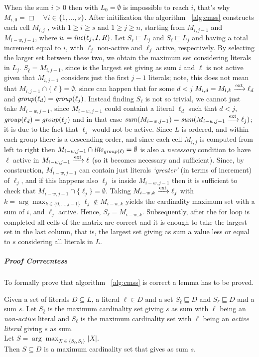 When the sum $ i > 0$ then with $L_0 = \emptyset$ is impossible to reach $i$, 
that's why $M_{i,0} = \Box \quad \forall i \in \{1, \hdots , s\}$.
After initilization the algorithm ~\ref{alg:cmss} constructs each cell $M_{i,j}$
, with $ 1 \ge i \ge s$ and $1 \ge j \ge n$, starting from $M_{i,j-1}$ and $M_{i-w,j-1}$,
where $w = \mathit{inc}(\ell_j,I,R)$.
Let $S_{\overline{\ell}} \sqsubseteq L_j $ and $S_{\ell} \sqsubseteq L_j$ and having 
a total increment equal to $i$, with \(\ell_j\) 
non-active and \(\ell_j\) active, respectively. 
By selecting the larger set between these two, 
we obtain the maximum set considering literals in $L_j$.
$S_{\overline{\ell}} = M_{i,j-1}$, since is the largest set giving as sum $i$
and $\ell$ is not active given that $M_{i,j-1}$ considers just the first $j-1$ literals;
note, this does not mean that $M_{i,j-1} \cap \{\ell\} = \emptyset$, since can happen 
that for some $d < j$ $M_{i,d} = M_{l,k} \xrightarrow{\text{ext}} \ell_d$ and $\mathit{group}(\ell_d) = \mathit{group}(\ell_j)$.
Instead finding $S_{\ell}$ is not so trivial, we cannot just take $M_{i-w,j-1}$,
since $M_{i-w,j-1}$ could containt a literal $\ell_d$ such that $d < j$,
$\mathit{group}(\ell_d) = \mathit{group}(\ell_j)$ and in that case 
$\mathit{sum}(M_{i-w,j-1}) = \mathit{sum}(M_{i-w,j-1} \xrightarrow{\text{ext}} \ell_j)$;
it is due to the fact that $\ell_j$ would not be active.
Since $L$ is ordered, and within each group there is a descending order, and since each 
cell $M_{i,j}$ is computed from left to right
then $M_{i-w,j-1} \cap \mathit{lits}_{\mathit{group}(\ell)} = \emptyset$ is also a \textit{necessary}
condition to have $\ell$
active in $M_{i-w,j-1} \xrightarrow{\text{ext}} \ell$
(so it becomes necessary and sufficient).
Since, by construction, $M_{i-w,j-1}$ can contain just literals \textit{`greater'} (in terms of 
increment) of $\ell_j$, and if this happens also $\ell_j$ is inside $M_{i-w,j-1}$ then 
it is sufficient to check that $M_{i-w,j-1} \cap \{\ell_j\} = \emptyset$.
Taking $M_{i-w,k} \xrightarrow{\text{ext}} \ell_j$ with $k = \arg \max_{k \in \{0,\hdots,j-1\}} \ell_j \not\in M_{i-w,k}$ 
yields the cardinality maximum set with a sum of \( i \), and \(\ell_j\) active.
Hence, $S_{\ell} = M_{i-w,k}$.
Subsequently, after the for loop is completed all cells of the matrix are correct 
and it is enough to take the largest set in the last column, that is, the 
largest set giving as sum a value less or equal to $s$ considering all literals in $L$.

\subparagraph{Proof Correcntess}
To formally prove that algorithm ~\ref{alg:cmss} is correct a lemma 
has to be proved.
\begin{lemma}
    Given a set of literals $D \subseteq L$, a literal $\ell \in D$ and a set $S_{\overline{\ell}} \sqsubseteq D$
    and $S_{\ell} \sqsubseteq D$ and a sum $s$.
    Let $S_{\overline{\ell}}$ is the maximum cardinality set giving $s$ as sum with $\ell$ being an \textit{non-active} literal
    and $S_{\ell}$ is the maximum cardinality set with $\ell$ being an \textit{active literal} giving $s$  as sum.\\
    Let $ S = \arg\max_{X \in \{S_{\ell}, S_{\overline{\ell}}\}} |X| $. \\ 
    Then $S \subseteq D$ is a maximum cardinality set that gives as sum $s$.
    \label{lemma:cmin}
\end{lemma}

